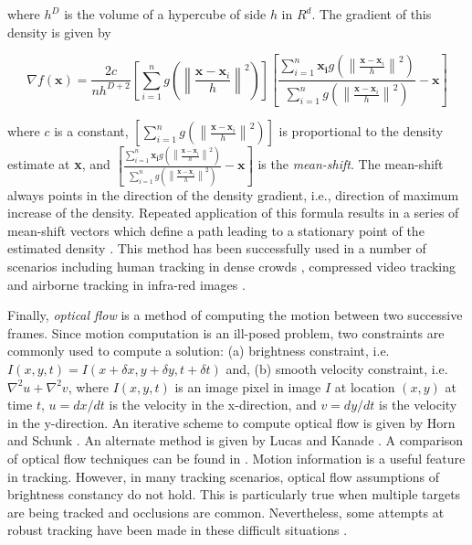 \begin{Body}
where $h^D$ is the volume of a hypercube of side $h$ in $R^d$.  The gradient of this density is given by

\begin{equation}
\nabla f(\mathbf{x}) = \frac{2c}{nh^{D+2}} 
\left[ \sum_{i=1}^n  g \left({ \left\|   \frac{\mathbf{x}-\mathbf{x}_i}{h}\right\| }^2 \right) \right] 
\left[ \frac{ \sum_{i=1}^n  \mathbf{\mathbf{x}_i}g \left({ \left\|   \frac{\mathbf{x}-\mathbf{x}_i}{h}\right\| }^2 \right)}{\sum_{i=1}^n  g \left({ \left\|   \frac{\mathbf{x}-\mathbf{x}_i}{h}\right\| }^2 \right)} -\mathbf{x}\right] 
\end{equation}

where $c$ is a constant, $\left[ \sum_{i=1}^n  g \left({ \left\|   \frac{\mathbf{x}-\mathbf{x}_i}{h}\right\| }^2 \right) \right]$ is proportional to the density estimate at \textbf{x}, and $\left[ \frac{ \sum_{i=1}^n  \mathbf{\mathbf{x}_i}g \left({ \left\|   \frac{\mathbf{x}-\mathbf{x}_i}{h}\right\| }^2 \right)}{\sum_{i=1}^n  g \left({ \left\|   \frac{\mathbf{x}-\mathbf{x}_i}{h}\right\| }^2 \right)} -\mathbf{x}\right]$ is the \emph{mean-shift}.  The mean-shift always points in the direction of the density gradient, i.e., direction of maximum increase of the density.  Repeated application of this formula results in a series of mean-shift vectors which define a path leading to a stationary point of the estimated density \cite{2002_JNL_MeanShift_Comaniciu}.  This method has been successfully used in a number of scenarios including human tracking in dense crowds \cite{2000_CNF_RealTimeTrackingMeanShift_Comaniciu}, compressed video tracking \cite{2009_CNF_Compensation_Aslam} and airborne tracking in infra-red images \cite{2003_JNL_AirborneIRtracking_Yilmaz}.  

Finally, \emph{optical flow} is a method of computing the motion between two successive frames.  Since motion computation is an ill-posed problem, two constraints are commonly used to compute a solution: (a) brightness constraint, i.e. $I(x,y,t) = I(x+\delta x,y+\delta y,t+\delta t)$ and, (b) smooth velocity constraint, i.e. $\nabla^2 u + \nabla^2 v$, where $I(x,y,t)$ is an image pixel in image $I$ at location $(x,y)$ at time $t$, $u=dx/dt$ is the velocity in the x-direction, and $v=dy/dt$ is the velocity in the y-direction.  An iterative scheme to compute optical flow is given by Horn and Schunk \cite{1981_JNL_OpticalFlow_HornSchunck}.  An alternate method is given by Lucas and Kanade \cite{1981_CNF_IterativeImageRegistration_LucasKanade}.  A comparison of optical flow techniques can be found in \cite{1994_JNL_PerfOpticalFlow_Barron}.  Motion information is a useful feature in tracking.  However, in many tracking scenarios, optical flow assumptions of brightness constancy do not hold.  This is particularly true when multiple targets are being tracked and occlusions are common.  Nevertheless, some attempts at robust tracking have been made in these difficult situations \cite{1996_CNF_MultipleMotionsFlowFields_Black}.


\end{Body}
